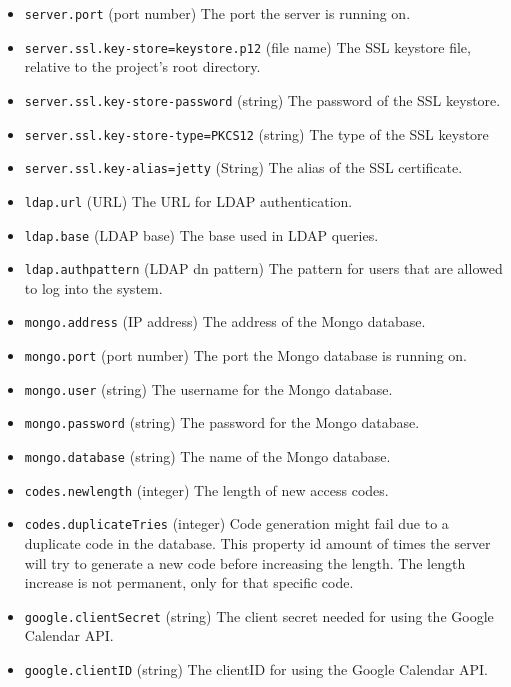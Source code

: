 \begin{itemize}
\item \verb!server.port! (port number) The port the server is running on.
\item \verb!server.ssl.key-store=keystore.p12! (file name) The SSL keystore file, relative to the project's root directory.
\item \verb!server.ssl.key-store-password! (string) The password of the SSL keystore.
\item \verb!server.ssl.key-store-type=PKCS12! (string) The type of the SSL keystore 
\item \verb!server.ssl.key-alias=jetty! (String) The alias of the SSL certificate.

\item \verb!ldap.url! (URL) The URL for LDAP authentication.
\item \verb!ldap.base! (LDAP base) The base used in LDAP queries.
\item \verb!ldap.authpattern! (LDAP dn pattern) The pattern for users that are allowed to log into the system. 
\item \verb!mongo.address! (IP address) The address of the Mongo database.
\item \verb!mongo.port! (port number) The port the Mongo database is running on.
\item \verb!mongo.user! (string) The username for the Mongo database.
\item \verb!mongo.password! (string) The password for the Mongo database.
\item \verb!mongo.database! (string) The name of the Mongo database.

\item \verb!codes.newlength! (integer) The length of new access codes.
\item \verb!codes.duplicateTries! (integer) Code generation might fail due to a duplicate code in the database. This property id amount of times the server will try to generate a new code before increasing the length. The length increase is not permanent, only for that specific code.

\item \verb!google.clientSecret! (string) The client secret needed for using the Google Calendar API.
\item \verb!google.clientID! (string) The clientID for using the Google Calendar API.


\end{itemize}
